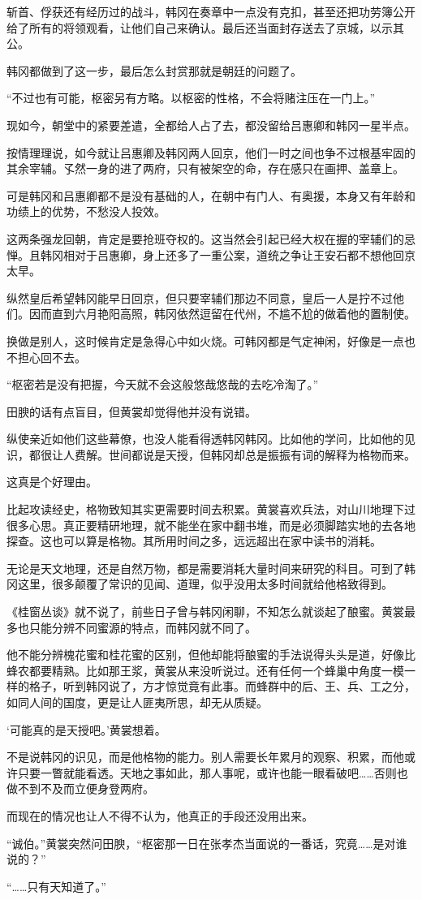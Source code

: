 斩首、俘获还有经历过的战斗，韩冈在奏章中一点没有克扣，甚至还把功劳簿公开给了所有的将领观看，让他们自己来确认。最后还当面封存送去了京城，以示其公。

韩冈都做到了这一步，最后怎么封赏那就是朝廷的问题了。

“不过也有可能，枢密另有方略。以枢密的性格，不会将赌注压在一门上。”

现如今，朝堂中的紧要差遣，全都给人占了去，都没留给吕惠卿和韩冈一星半点。

按情理理说，如今就让吕惠卿及韩冈两人回京，他们一时之间也争不过根基牢固的其余宰辅。孓然一身的进了两府，只有被架空的命，存在感只在画押、盖章上。

可是韩冈和吕惠卿都不是没有基础的人，在朝中有门人、有奥援，本身又有年龄和功绩上的优势，不愁没人投效。

这两条强龙回朝，肯定是要抢班夺权的。这当然会引起已经大权在握的宰辅们的忌惮。且韩冈相对于吕惠卿，身上还多了一重公案，道统之争让王安石都不想他回京太早。

纵然皇后希望韩冈能早日回京，但只要宰辅们那边不同意，皇后一人是拧不过他们。因而直到六月艳阳高照，韩冈依然逗留在代州，不尴不尬的做着他的置制使。

换做是别人，这时候肯定是急得心中如火烧。可韩冈都是气定神闲，好像是一点也不担心回不去。

“枢密若是没有把握，今天就不会这般悠哉悠哉的去吃冷淘了。”

田腴的话有点盲目，但黄裳却觉得他并没有说错。

纵使亲近如他们这些幕僚，也没人能看得透韩冈韩冈。比如他的学问，比如他的见识，都很让人费解。世间都说是天授，但韩冈却总是振振有词的解释为格物而来。

这真是个好理由。

比起攻读经史，格物致知其实更需要时间去积累。黄裳喜欢兵法，对山川地理下过很多心思。真正要精研地理，就不能坐在家中翻书堆，而是必须脚踏实地的去各地探查。这也可以算是格物。其所用时间之多，远远超出在家中读书的消耗。

无论是天文地理，还是自然万物，都是需要消耗大量时间来研究的科目。可到了韩冈这里，很多颠覆了常识的见闻、道理，似乎没用太多时间就给他格致得到。

《桂窗丛谈》就不说了，前些日子曾与韩冈闲聊，不知怎么就谈起了酿蜜。黄裳最多也只能分辨不同蜜源的特点，而韩冈就不同了。

他不能分辨槐花蜜和桂花蜜的区别，但他却能将酿蜜的手法说得头头是道，好像比蜂农都要精熟。比如那王浆，黄裳从来没听说过。还有任何一个蜂巢中角度一模一样的格子，听到韩冈说了，方才惊觉竟有此事。而蜂群中的后、王、兵、工之分，如同人间的国度，更是让人匪夷所思，却无从质疑。

‘可能真的是天授吧。’黄裳想着。

不是说韩冈的识见，而是他格物的能力。别人需要长年累月的观察、积累，而他或许只要一瞥就能看透。天地之事如此，那人事呢，或许也能一眼看破吧……否则也做不到不及而立便身登两府。

而现在的情况也让人不得不认为，他真正的手段还没用出来。

“诚伯。”黄裳突然问田腴，“枢密那一日在张孝杰当面说的一番话，究竟……是对谁说的？”

“……只有天知道了。”


